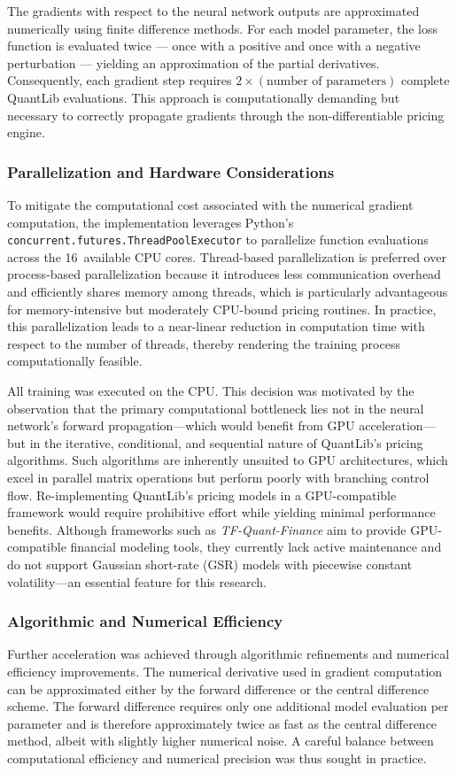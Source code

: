 {The gradients with respect to the neural network outputs are approximated numerically using finite difference methods. For each model parameter, the loss function is evaluated twice — once with a positive and once with a negative perturbation — yielding an approximation of the partial derivatives. Consequently, each gradient step requires $2 \times (\text{number of parameters})$ complete QuantLib evaluations. This approach is computationally demanding but necessary to correctly propagate gradients through the non-differentiable pricing engine.

\subsubsection{Parallelization and Hardware Considerations}
To mitigate the computational cost associated with the numerical gradient computation, the implementation leverages Python’s \texttt{concurrent.futures.ThreadPoolExecutor} to parallelize function evaluations across the 16~available CPU cores. Thread-based parallelization is preferred over process-based parallelization because it introduces less communication overhead and efficiently shares memory among threads, which is particularly advantageous for memory-intensive but moderately CPU-bound pricing routines. In practice, this parallelization leads to a near-linear reduction in computation time with respect to the number of threads, thereby rendering the training process computationally feasible.

All training was executed on the CPU. This decision was motivated by the observation that the primary computational bottleneck lies not in the neural network’s forward propagation—which would benefit from GPU acceleration—but in the iterative, conditional, and sequential nature of QuantLib’s pricing algorithms. Such algorithms are inherently unsuited to GPU architectures, which excel in parallel matrix operations but perform poorly with branching control flow. Re-implementing QuantLib’s pricing models in a GPU-compatible framework would require prohibitive effort while yielding minimal performance benefits. Although frameworks such as \textit{TF-Quant-Finance} aim to provide GPU-compatible financial modeling tools, they currently lack active maintenance and do not support Gaussian short-rate (GSR) models with piecewise constant volatility—an essential feature for this research.

\subsubsection{Algorithmic and Numerical Efficiency}
\label{subsubsec:algorithmic_and_numerical_efficiency}
Further acceleration was achieved through algorithmic refinements and numerical efficiency improvements. The numerical derivative used in gradient computation can be approximated either by the forward difference or the central difference scheme. The forward difference requires only one additional model evaluation per parameter and is therefore approximately twice as fast as the central difference method, albeit with slightly higher numerical noise. A careful balance between computational efficiency and numerical precision was thus sought in practice.

}
